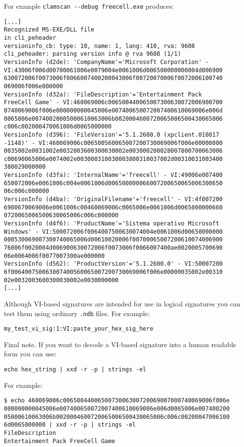 \documentclass[a4paper,titlepage,12pt]{article}
\begin{document}
    For example \verb+clamscan --debug freecell.exe+ produces:
    \begin{verbatim}
[...]
Recognized MS-EXE/DLL file
in cli_peheader
versioninfo_cb: type: 10, name: 1, lang: 410, rva: 9608
cli_peheader: parsing version info @ rva 9608 (1/1)
VersionInfo (d2de): 'CompanyName'='Microsoft Corporation' -
VI:43006f006d00700061006e0079004e0061006d006500000000004d006900
630072006f0073006f0066007400200043006f00720070006f0072006100740
069006f006e000000
VersionInfo (d32a): 'FileDescription'='Entertainment Pack
FreeCell Game' - VI:460069006c006500440065007300630072006900700
0740069006f006e000000000045006e007400650072007400610069006e006d
0065006e00740020005000610063006b0020004600720065006500430065006
c006c002000470061006d0065000000
VersionInfo (d396): 'FileVersion'='5.1.2600.0 (xpclient.010817
-1148)' - VI:460069006c006500560065007200730069006f006e00000000
0035002e0031002e0032003600300030002e003000200028007800700063006
c00690065006e0074002e003000310030003800310037002d00310031003400
380029000000
VersionInfo (d3fa): 'InternalName'='freecell' - VI:49006e007400
650072006e0061006c004e0061006d006500000066007200650065006300650
06c006c000000
VersionInfo (d4ba): 'OriginalFilename'='freecell' - VI:4f007200
6900670069006e0061006c00460069006c0065006e0061006d0065000000660
0720065006500630065006c006c000000
VersionInfo (d4f6): 'ProductName'='Sistema operativo Microsoft
Windows' - VI:500072006f0064007500630074004e0061006d00650000000
000530069007300740065006d00610020006f00700065007200610074006900
76006f0020004d006900630072006f0073006f0066007400ae0020005700690
06e0064006f0077007300ae000000
VersionInfo (d562): 'ProductVersion'='5.1.2600.0' - VI:50007200
6f006400750063007400560065007200730069006f006e00000035002e00310
02e0032003600300030002e0030000000
[...]
    \end{verbatim}
Although VI-based signatures are intended for use in logical signatures you can test them
using ordinary \verb+.ndb+ files. For example:
    \begin{verbatim}
my_test_vi_sig:1:VI:paste_your_hex_sig_here
    \end{verbatim}
Final note. If you want to decode a VI-based signature into a human readable form you can use:
    \begin{verbatim}
echo hex_string | xxd -r -p | strings -el
    \end{verbatim}
For example:
    \begin{verbatim}
$ echo 460069006c0065004400650073006300720069007000740069006f006e
000000000045006e007400650072007400610069006e006d0065006e007400200
05000610063006b0020004600720065006500430065006c006c00200047006100
6d0065000000 | xxd -r -p | strings -el
FileDescription
Entertainment Pack FreeCell Game
    \end{verbatim}
\end{document}
